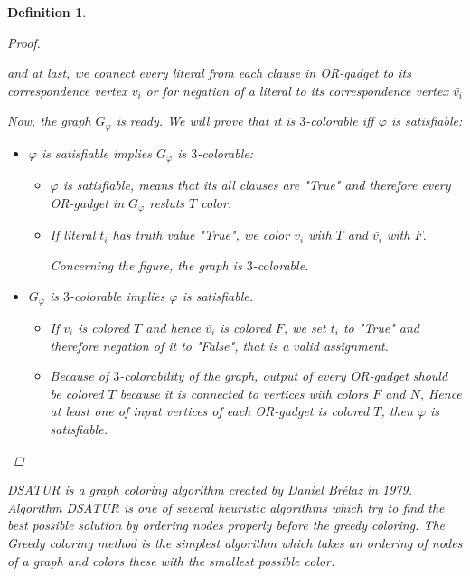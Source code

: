\documentclass[12pt]{article}
\theoremstyle{slplain}
\newtheorem{defi}{Definition}
\begin{document}
\begin{defi}
\begin{proof}
\begin{center}
\end{center}
\vspace{1cm}

and at last, we connect every literal from each clause in OR-gadget to its correspondence vertex $v_i$ or for negation of a literal to its correspondence vertex $\bar{v_i}$

Now, the graph $G_\varphi$ is ready. We will prove that it is $3$-colorable iff $\varphi$ is satisfiable:

\begin{itemize}
\item $\varphi$ is satisfiable implies $G_\varphi$ is $3$-colorable:

\begin{itemize}
\item $\varphi$ is satisfiable, means that its all clauses are "True" and therefore every OR-gadget in $G_\varphi$ resluts $T$ color. 

\item If literal $t_i$ has truth value "True", we color $v_i$ with $T$ and $\bar{v_i}$ with $F$. 

Concerning the figure, the graph is $3$-colorable. 

\end{itemize}
\item $G_\varphi$ is $3$-colorable implies $\varphi$ is satisfiable.
\begin{itemize}
\item If $v_i$ is colored $T$ and hence $\bar{v_i}$ is colored $F$, we set $t_i$ to "True" and therefore negation of it to "False", that is a valid assignment.

\item Because of $3$-colorability of the graph, output of every OR-gadget should be colored $T$ because it is connected to vertices with colors $F$ and $N$, Hence at least one of input vertices of each OR-gadget is colored $T$, then $\varphi$ is satisfiable. 
\end{itemize}
\end{itemize}

\end{proof}


DSATUR is a graph coloring algorithm created by Daniel Br\'elaz \cite{brelaz} in 1979. Algorithm DSATUR is one of several heuristic algorithms which try to find the best possible solution by ordering nodes properly before the greedy coloring. The Greedy coloring method is the simplest algorithm which takes an ordering of nodes of a graph and colors these with the smallest possible color. 


\end{defi}
\end{document}
